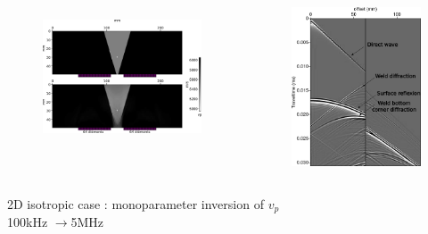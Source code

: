 \documentclass[11pt,xcolor=x11names,compress, notes=show]{beamer}%
\begin{document}
\begin{frame}
	\begin{columns}
		\begin{figure}[!h]
			\flushleft
			\includegraphics[width=\textwidth]{img/vp.png}\\[0.5cm]
		\end{figure}
		\vline
		\begin{figure}[!h]
			\flushright
			\vspace{-1cm}
			\includegraphics[width=\textwidth]{img/ondes.png}
		\end{figure}
	\end{columns}
	\begin{center}
			2D isotropic case :  monoparameter inversion of $v_{p}$\\ 100kHz $\rightarrow$5MHz
	\end{center}

\end{frame}
\end{document}
